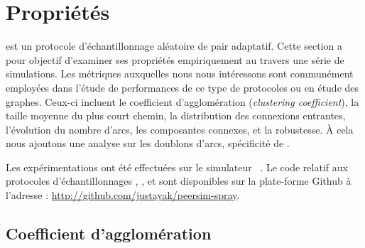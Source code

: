 
\section{Propriétés}
\label{net:sec:properties}

\SPRAY est un protocole d'échantillonnage aléatoire de pair adaptatif. Cette
section a pour objectif d'examiner ses propriétés empiriquement au travers une
série de simulations. Les métriques auxquelles nous nous intéressons sont
communément employées dans l'étude de performances de ce type de protocoles ou
en étude des graphes. Ceux-ci incluent le coefficient d'agglomération
(\emph{clustering coefficient}), la taille moyenne du plus court chemin, la
distribution des connexions entrantes, l'évolution du nombre d'arcs, les
composantes connexes, et la robustesse. À cela nous ajoutons une analyse sur les
doublons d'arcs, spécificité de \SPRAY.


Les expérimentations ont été effectuées sur le simulateur
\PEERSIM~\cite{montresor2009peersim}. Le code relatif aux protocoles
d'échantillonnages \CYCLON, \SCAMP, et \SPRAY sont disponibles sur la
plate-forme Github à l'adresse : \url{http://github.com/justayak/peersim-spray}.

\subsection{Coefficient d'agglomération}
\label{net:subsec:clustering}

